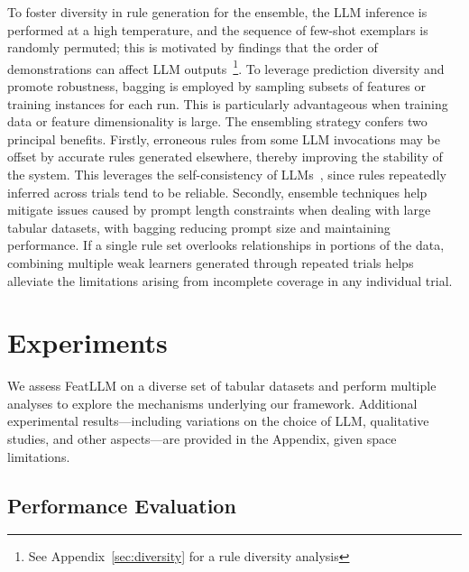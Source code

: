 To foster diversity in rule generation for the ensemble, the LLM inference is performed at a high temperature, and the sequence of few-shot exemplars is randomly permuted; this is motivated by findings that the order of demonstrations can affect LLM outputs~\cite{lu2022fantastically}\footnote{See Appendix~\ref{sec:diversity} for a rule diversity analysis}. To leverage prediction diversity and promote robustness, bagging is employed by sampling subsets of features or training instances for each run. This is particularly advantageous when training data or feature dimensionality is large. The ensembling strategy confers two principal benefits. Firstly, erroneous rules from some LLM invocations may be offset by accurate rules generated elsewhere, thereby improving the stability of the system. This leverages the self-consistency of LLMs~\cite{wang2022self}, since rules repeatedly inferred across trials tend to be reliable. Secondly, ensemble techniques help mitigate issues caused by prompt length constraints when dealing with large tabular datasets, with bagging reducing prompt size and maintaining performance. If a single rule set overlooks relationships in portions of the data, combining multiple weak learners generated through repeated trials helps alleviate the limitations arising from incomplete coverage in any individual trial.

\section{Experiments}
We assess \textsf{FeatLLM} on a diverse set of tabular datasets and perform multiple analyses to explore the mechanisms underlying our framework. Additional experimental results—including variations on the choice of LLM, qualitative studies, and other aspects—are provided in the Appendix, given space limitations.

\subsection{Performance Evaluation}
